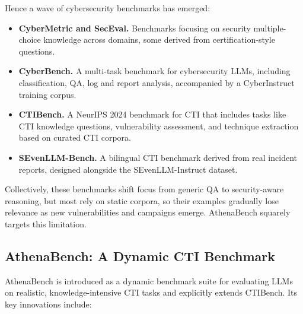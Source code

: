 \documentclass[10pt]{article}
\begin{document}
Hence a wave of cybersecurity benchmarks has emerged:

\begin{itemize}[leftmargin=*]
  \item \textbf{CyberMetric and SecEval.} Benchmarks focusing on security multiple-choice knowledge across domains, some derived from certification-style questions.\cite{liu2024cyberbench,hu2024seceval}
  \item \textbf{CyberBench.} A multi-task benchmark for cybersecurity LLMs, including classification, QA, log and report analysis, accompanied by a CyberInstruct training corpus.\cite{liu2024cyberbench}
  \item \textbf{CTIBench.} A NeurIPS 2024 benchmark for CTI that includes tasks like CTI knowledge questions, vulnerability assessment, and technique extraction based on curated CTI corpora.\cite{alam2024ctibench}
  \item \textbf{SEvenLLM-Bench.} A bilingual CTI benchmark derived from real incident reports, designed alongside the SEvenLLM-Instruct dataset.\cite{ji2024sevenllm}
\end{itemize}

Collectively, these benchmarks shift focus from generic QA to security-aware reasoning, but most rely on static corpora, so their examples gradually lose relevance as new vulnerabilities and campaigns emerge. AthenaBench squarely targets this limitation.

\subsection{AthenaBench: A Dynamic CTI Benchmark}

AthenaBench is introduced as a dynamic benchmark suite for evaluating LLMs on realistic, knowledge-intensive CTI tasks and explicitly extends CTIBench.\cite{alam2025athenabench,alam2024ctibench} Its key innovations include:
\end{document}
